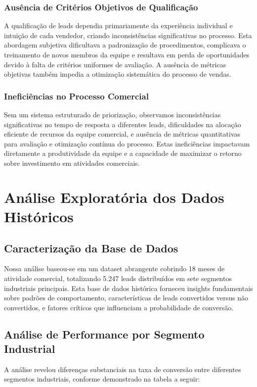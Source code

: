 \documentclass[portuguese,11pt]{article}
\begin{document}
\subsubsection{Ausência de Critérios Objetivos de Qualificação}
A qualificação de leads dependia primariamente da experiência individual e intuição de cada vendedor, criando inconsistências significativas no processo. Esta abordagem subjetiva dificultava a padronização de procedimentos, complicava o treinamento de novos membros da equipe e resultava em perda de oportunidades devido à falta de critérios uniformes de avaliação. A ausência de métricas objetivas também impedia a otimização sistemática do processo de vendas.

\subsubsection{Ineficiências no Processo Comercial}
Sem um sistema estruturado de priorização, observamos inconsistências significativas no tempo de resposta a diferentes leads, dificuldades na alocação eficiente de recursos da equipe comercial, e ausência de métricas quantitativas para avaliação e otimização contínua do processo. Estas ineficiências impactavam diretamente a produtividade da equipe e a capacidade de maximizar o retorno sobre investimento em atividades comerciais.

\section{Análise Exploratória dos Dados Históricos}

\subsection{Caracterização da Base de Dados}
Nossa análise baseou-se em um dataset abrangente cobrindo 18 meses de atividade comercial, totalizando 5.247 leads distribuídos em sete segmentos industriais principais. Esta base de dados histórica forneceu insights fundamentais sobre padrões de comportamento, características de leads convertidos versus não convertidos, e fatores críticos que influenciam a probabilidade de conversão.

\subsection{Análise de Performance por Segmento Industrial}
A análise revelou diferenças substanciais na taxa de conversão entre diferentes segmentos industriais, conforme demonstrado na tabela a seguir:
\end{document}
